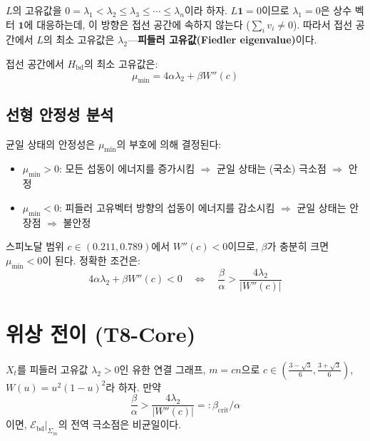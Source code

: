 $L$의 고유값을 $0 = \lambda_1 < \lambda_2 \leq \lambda_3 \leq \cdots \leq \lambda_n$이라 하자. $L \mathbf{1} = 0$이므로 $\lambda_1 = 0$은 상수 벡터 $\mathbf{1}$에 대응하는데, 이 방향은 접선 공간에 속하지 않는다 ($\sum_i v_i \neq 0$). 따라서 접선 공간에서 $L$의 최소 고유값은 $\lambda_2$---\textbf{피들러 고유값(Fiedler eigenvalue)}이다.

접선 공간에서 $H_{\mathrm{bd}}$의 최소 고유값은:
\begin{equation}
    \mu_{\min} = 4\alpha\lambda_2 + \beta W''(c)
    \label{eq:min-eigenvalue}
\end{equation}

\subsection{선형 안정성 분석}

균일 상태의 안정성은 $\mu_{\min}$의 부호에 의해 결정된다:
\begin{itemize}
    \item $\mu_{\min} > 0$: 모든 섭동이 에너지를 증가시킴 $\Rightarrow$ 균일 상태는 (국소) 극소점 $\Rightarrow$ 안정
    \item $\mu_{\min} < 0$: 피들러 고유벡터 방향의 섭동이 에너지를 감소시킴 $\Rightarrow$ 균일 상태는 안장점 $\Rightarrow$ 불안정
\end{itemize}

스피노달 범위 $c \in (0.211, 0.789)$에서 $W''(c) < 0$이므로, $\beta$가 충분히 크면 $\mu_{\min} < 0$이 된다. 정확한 조건은:
\begin{equation}
    4\alpha\lambda_2 + \beta W''(c) < 0 \quad \iff \quad \frac{\beta}{\alpha} > \frac{4\lambda_2}{|W''(c)|}
    \label{eq:instability-condition}
\end{equation}


\section{위상 전이 (T8-Core)}
\label{sec:T8-Core}

\begin{theorem}
\label{thm:T8-Core}
$X_t$를 피들러 고유값 $\lambda_2 > 0$인 유한 연결 그래프, $m = cn$으로 $c \in \left(\frac{3-\sqrt{3}}{6}, \frac{3+\sqrt{3}}{6}\right)$, $W(u) = u^2(1-u)^2$라 하자. 만약
\begin{equation}
    \boxed{\frac{\beta}{\alpha} > \frac{4\lambda_2}{|W''(c)|} =: \beta_{\mathrm{crit}}/\alpha}
    \label{eq:phase-transition}
\end{equation}
이면, $\mathcal{E}_{\mathrm{bd}}|_{\Sigma_m}$의 전역 극소점은 비균일이다.
\end{theorem}

